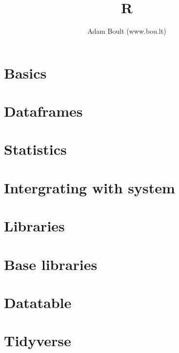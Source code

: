 \documentclass[oneside]{book}
\begin{document}
\author{Adam Boult (www.bou.lt)}
\title{R}
\maketitle

\setcounter{tocdepth}{0}
\tableofcontents



\part{Basics}







\part{Dataframes}


\part{Statistics}

\part{Intergrating with system}



\part{Libraries}

\part{Base libraries}

\part{Datatable}


\part{Tidyverse}







\end{document}
